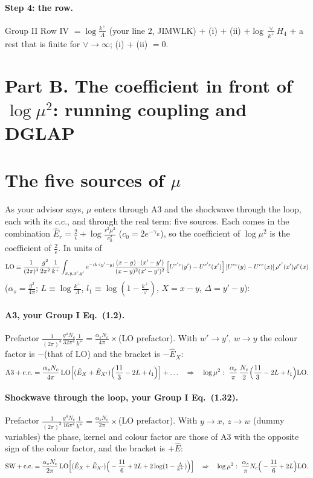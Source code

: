\documentclass[10pt]{article}
\numberwithin{equation}{section}
\begin{document}
\paragraph{Step 4: the row.} Group II Row IV $=\log\frac{k^+}{\Lambda}$ (your line 2, JIMWLK) $+$ (i) $+$ (ii) $+\log\frac{\vee}{k^+}H_4$ $+$ a rest that is finite for $\vee\to\infty$; (i) $+$ (ii) $=0$.

\section*{Part B. The coefficient in front of $\log\mu^2$: running coupling and DGLAP}
\section{The five sources of \texorpdfstring{$\mu$}{mu}}\label{sec:mu}
As your advisor says, $\mu$ enters through A3 and the shockwave through the loop, each with its c.c., and through the real term: five sources. Each comes in the combination $\hat E_r=\frac{2}{\epsilon}+\log\frac{r^2\mu^2}{c_0^2}$ ($c_0=2e^{-\gamma_E}$), so the coefficient of $\log\mu^2$ is the coefficient of $\frac{2}{\epsilon}$. In units of
\begin{equation*}
{\rm LO}\equiv\frac{1}{(2\pi)^{3}}\frac{g^{2}}{2\pi^{2}}\frac{1}{k^{+}}\int_{x,y,x',y'}e^{-ik\cdot(y'-y)}\frac{(x-y)\cdot(x'-y')}{(x-y)^{2}(x'-y')^{2}}\left[U^{e'c}(y')-U^{e'c}(x')\right]\left[U^{ec}(y)-U^{ce}(x)\right]\rho^{e'}(x')\rho^{e}(x)
\end{equation*}
($\alpha_s=\frac{g^2}{4\pi}$; $L\equiv\log\frac{k^+}{\Lambda}$, $l_1\equiv\log(1-\frac{k^+}{\vee})$, $X=x-y$, $\Delta=y'-y$):
\paragraph{A3, your Group I Eq.~(1.2).} Prefactor $\frac{1}{(2\pi)^3}\frac{g^4N_c}{32\pi^4}\frac{1}{k^+}=\frac{\alpha_sN_c}{4\pi}\times$(LO prefactor). With $w'\to y'$, $w\to y$ the colour factor is $-$(that of LO) and the bracket is $-\hat E_X$:
\begin{equation}
\text{A3}+\text{c.c.}=\frac{\alpha_sN_c}{4\pi}\,{\rm LO}\Big[(\hat E_X+\hat E_{X'})\Big(\frac{11}{3}-2L+l_1\Big)\Big]+\dots\quad\Rightarrow\quad\log\mu^2:\ \frac{\alpha_s}{\pi}\,\frac{N_c}{2}\Big(\frac{11}{3}-2L+l_1\Big){\rm LO}.
\label{eq:muA3}
\end{equation}
\paragraph{Shockwave through the loop, your Group I Eq.~(1.32).} Prefactor $\frac{1}{(2\pi)^3}\frac{g^4N_c}{16\pi^4}\frac{1}{k^+}=\frac{\alpha_sN_c}{2\pi}\times$(LO prefactor). With $y\to x$, $z\to w$ (dummy variables) the phase, kernel and colour factor are those of A3 with the opposite sign of the colour factor, and the bracket is $+\hat E$:
\begin{equation}
\text{SW}+\text{c.c.}=\frac{\alpha_sN_c}{2\pi}\,{\rm LO}\Big[(\hat E_X+\hat E_{X'})\Big(-\frac{11}{6}+2L+2\log(1-\tfrac{\Lambda}{k^+})\Big)\Big]\quad\Rightarrow\quad\log\mu^2:\ \frac{\alpha_s}{\pi}N_c\Big(-\frac{11}{6}+2L\Big){\rm LO}.
\label{eq:muSW}
\end{equation}
\end{document}
